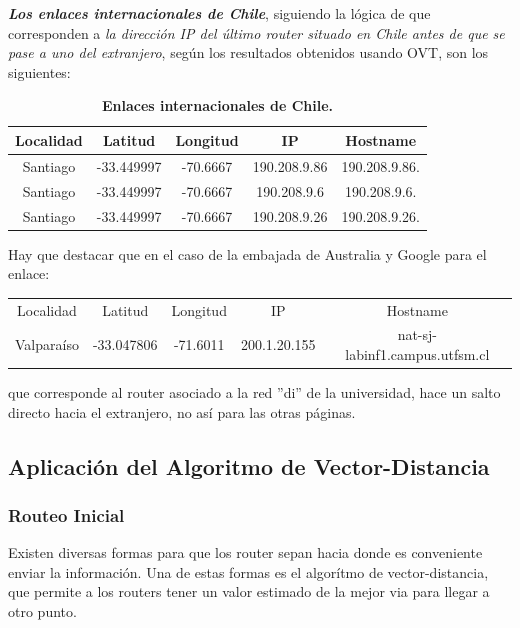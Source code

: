 \documentclass[12pt]{article}
\begin{document}
\textbf{\textit{Los enlaces internacionales de Chile}}, siguiendo la lógica de que corresponden a \emph{la dirección IP del último router situado en Chile antes de que se pase a uno del extranjero}, según los resultados obtenidos usando OVT, son los siguientes:

\begin{table}[H]
\centering
\begin{tabular}{| c | c | c | c | c |}
\hline
Localidad & Latitud & Longitud & IP & Hostname\\
\hline
Santiago & -33.449997 & -70.6667 & 190.208.9.86 & 190.208.9.86.\\
\hline
Santiago & -33.449997 & -70.6667 & 190.208.9.6 & 190.208.9.6.\\
\hline
Santiago & -33.449997 & -70.6667 & 190.208.9.26 & 190.208.9.26.\\
\hline
\end{tabular}
\caption{\small \textbf{Enlaces internacionales de Chile.}}
\end{table}

Hay que destacar que en el caso de la embajada de Australia y Google para el enlace:

\begin{table}[H]
\centering
\begin{tabular}{ c  c  c  c  c }
Localidad & Latitud & Longitud & IP & Hostname\\
Valparaíso & -33.047806 & -71.6011 & 200.1.20.155 & nat-sj-labinf1.campus.utfsm.cl\\
\end{tabular}
\end{table}

que corresponde al router asociado a la red ''di'' de la universidad, hace un salto directo hacia el extranjero, no así para las otras páginas.

\newpage

\subsection{Aplicación del Algoritmo de Vector-Distancia}
\subsubsection{Routeo Inicial}
Existen diversas formas para que los router sepan hacia donde es conveniente enviar la información. Una de estas formas es el algorítmo de vector-distancia, que permite a los routers tener un valor estimado de la mejor via para llegar a otro punto.\\
\end{document}
